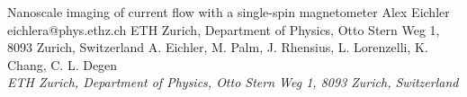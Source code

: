 \begin{conf-abstract}[]
{Nanoscale imaging of current flow with a single-spin magnetometer}
{\color{blue} Alex Eichler}
{eichlera@phys.ethz.ch}
{ETH Zurich, Department of Physics, Otto Stern Weg 1, 8093 Zurich, Switzerland}
{{\color{blue}A. Eichler, M. Palm, J. Rhensius, L. Lorenzelli, K. Chang, C. L. Degen}\\ \textit{ETH Zurich, Department of Physics, Otto Stern Weg 1, 8093 Zurich, Switzerland}\\ 
\decofourleft \decofourright}





\printbibliography[heading=none]

\end{conf-abstract}
